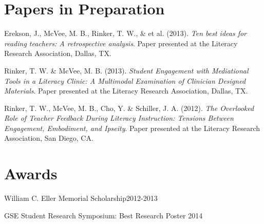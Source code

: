 


\halfblankline

\section{Papers in Preparation}
\vspace{-.1in}
\begin{bibsection}

\item Erekson, J., McVee, M. B., Rinker, T. W., \& et al. (2013). \emph{Ten best ideas for reading teachers: A retrospective analysis}. Paper presented at the Literacy Research Association, Dallas, TX.

\item Rinker, T. W. \& McVee, M. B. (2013).  \emph{Student Engagement with Mediational Tools in a Literacy Clinic: A Multimodal Examination of Clinician Designed Materials}.  Paper presented at the Literacy Research Association, Dallas, TX.

\item Rinker, T. W., McVee, M. B., Cho, Y. \& Schiller, J. A. (2012).  \emph{The Overlooked Role of Teacher Feedback During Literacy Instruction: Tensions Between Engagement, Embodiment, and Ipseity}.  Paper presented at the Literacy Research Association, San Diego, CA.



\end{bibsection}

\section{Awards}
\begin{innerlist}
    \item William C. Eller Memorial Scholarship\hfill 2012-2013
    \item GSE Student Research Symposium: Best Research Poster \hfill 2014
\end{innerlist}


